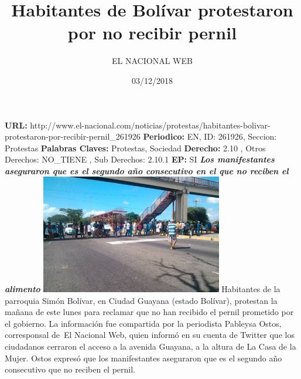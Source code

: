 \documentclass{article}%
\title{\textbf{Habitantes de Bolívar protestaron por no recibir pernil}}%
\author{EL NACIONAL WEB}%
\date{03/12/2018}%
\begin{document}
%
\normalsize%
\maketitle%
\textbf{URL: }%
http://www.el{-}nacional.com/noticias/protestas/habitantes{-}bolivar{-}protestaron{-}por{-}recibir{-}pernil\_261926\newline%
%
\textbf{Periodico: }%
EN, %
ID: %
261926, %
Seccion: %
Protestas\newline%
%
\textbf{Palabras Claves: }%
Protestas, Sociedad\newline%
%
\textbf{Derecho: }%
2.10%
, Otros Derechos: %
NO\_TIENE%
, Sub Derechos: %
2.10.1%
\newline%
%
\textbf{EP: }%
SI\newline%
\newline%
%
\textbf{\textit{Los manifestantes aseguraron que es el segundo año consecutivo en el que no reciben el alimento}}%
\newline%
\newline%
%
\includegraphics[width=300px]{136.jpg}%
\newline%
%
Habitantes de la parroquia Simón Bolívar, en Ciudad Guayana (estado Bolívar), protestan la mañana de este lunes para reclamar que no han recibido el pernil prometido por el gobierno.%
\newline%
%
La información fue compartida por la periodista Pableysa Ostos, corresponsal de~El Nacional Web, quien informó en su cuenta de Twitter que los ciudadanos cerraron el acceso a la avenida Guayana, a la altura de La Casa de la Mujer.%
\newline%
%
Ostos expresó que los manifestantes aseguraron que es el segundo año consecutivo que no reciben el pernil.%
\newline%
%
\end{document}
